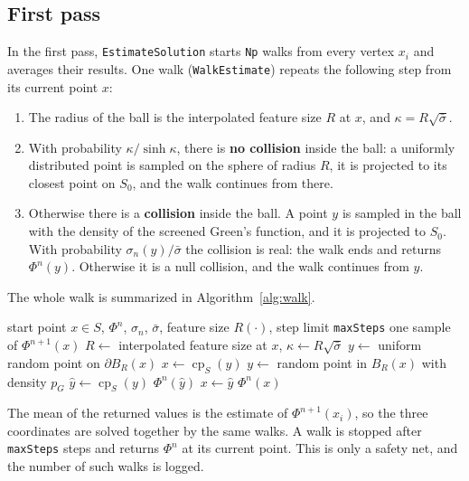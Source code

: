 \documentclass[
]{elteiktdk}[2024/04/26]
\begin{document}
	\subsection{First pass}
	
	In the first pass, \texttt{EstimateSolution} starts \texttt{Np} walks from every vertex $x_i$ and averages their results. One walk (\texttt{WalkEstimate}) repeats the following step from its current point $x$:
	\begin{enumerate}
		\item The radius of the ball is the interpolated feature size $R$ at $x$, and $\kappa = R \sqrt{\bar{\sigma}}$.
		\item With probability $\kappa / \sinh \kappa$, there is \textbf{no collision} inside the ball: a uniformly distributed point is sampled on the sphere of radius $R$, it is projected to its closest point on $S_0$, and the walk continues from there.
		\item Otherwise there is a \textbf{collision} inside the ball. A point $y$ is sampled in the ball with the density of the screened Green's function, and it is projected to $S_0$. With probability $\sigma_n(y) / \bar{\sigma}$ the collision is real: the walk ends and returns $\Phi^n(y)$. Otherwise it is a null collision, and the walk continues from $y$.
	\end{enumerate}
	The whole walk is summarized in Algorithm~\ref{alg:walk}.
	
	\begin{algorithm}[ht]
		\small
		\caption[One walk]{One walk $\textsc{WalkEstimate}(x)$ started from the vertex $x$.}
		\label{alg:walk}
		\begin{algorithmic}[1]
			\Require start point $x \in S$, $\Phi^n$, $\sigma_n$, $\bar\sigma$, feature size $R(\cdot)$, step limit \texttt{maxSteps}
			\Ensure one sample of $\Phi^{n+1}(x)$
			\State $R \gets$ interpolated feature size at $x$, \quad $\kappa \gets R\sqrt{\bar\sigma}$
			 
			\State $y \gets$ uniform random point on $\partial B_R(x)$
			\State $x \gets \operatorname{cp}_S(y)$
			\Else {}
			\State $y \gets$ random point in $B_R(x)$ with density $p_G$
			\State $\hat y \gets \operatorname{cp}_S(y)$
			 
			\State \Return $\Phi^n(\hat y)$
			\EndIf
			\State $x \gets \hat y$ 
			\EndIf
			\EndFor
			\State \Return $\Phi^n(x)$ 
		\end{algorithmic}
	\end{algorithm}
	The mean of the returned values is the estimate of $\Phi^{n+1}(x_i)$, so the three coordinates are solved together by the same walks. A walk is stopped after \texttt{maxSteps} steps and returns $\Phi^n$ at its current point. This is only a safety net, and the number of such walks is logged.
	
\end{document}
